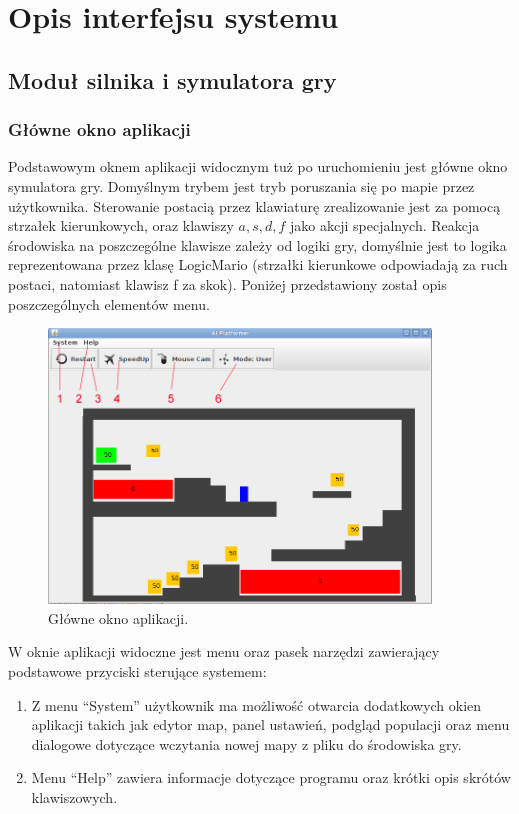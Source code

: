 \section{Opis interfejsu systemu}
\subsection{Moduł silnika i symulatora gry}
\subsubsection{Główne okno aplikacji}
\begin{par}
Podstawowym oknem aplikacji widocznym tuż po uruchomieniu jest główne okno symulatora gry. 
Domyślnym trybem jest tryb poruszania się po mapie przez użytkownika. 
Sterowanie postacią przez klawiaturę zrealizowanie jest za pomocą strzałek kierunkowych, oraz klawiszy $a,s,d,f$ jako akcji specjalnych.
Reakcja środowiska na poszczególne klawisze zależy od logiki gry, domyślnie jest to logika reprezentowana przez klasę LogicMario (strzałki kierunkowe odpowiadają za ruch postaci, natomiast klawisz f za skok).
Poniżej przedstawiony został opis poszczególnych elementów menu.
\begin{figure}[!h]
		\centering
		\includegraphics[width=4in]{obrazki/main_window.png}
		\caption{Główne okno aplikacji.}
		\label{fig:main_window}
	\end{figure}
W oknie aplikacji widoczne jest menu oraz pasek narzędzi zawierający podstawowe przyciski sterujące systemem:
	\begin{enumerate}
	\item Z menu ``System'' użytkownik ma możliwość otwarcia dodatkowych okien aplikacji takich jak edytor map, panel ustawień, podgląd populacji oraz menu dialogowe dotyczące wczytania nowej mapy z pliku do środowiska gry.
	\item Menu ``Help'' zawiera informacje dotyczące programu oraz krótki opis skrótów klawiszowych.

\end{enumerate}
\end{par}
